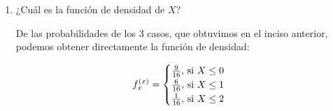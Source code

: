 \documentclass[12pt,a4paper]{report}
\begin{document}
\begin{enumerate}
{\begin{enumerate}
{					Tenemos que X toma los valores $X = \{0,1,2\}$\\
					
					En cada caso hay una posibilidad de $\frac{1}{4}$ de que la bola entre en la primera caja, sea "b" el símbolo que represente una bola en la primera caja y "0" cuando no está en la caja, tendríamos cuatro resultados:\\
					
					$P(00) = (\frac{3}{4})\cdot(\frac{3}{4})$\\
					$P(0b) = (\frac{3}{4})\cdot(\frac{1}{4})$\\
					$P(b0) = (\frac{1}{4})\cdot(\frac{3}{4})$\\
					$P(bb) = (\frac{1}{4})\cdot(\frac{1}{4})$\\
					
					De ahí, obtenemos las probabilidades de los 3 casos:\\
					
					$P(X=0) = P(00) = \frac{9}{16}$\\
					$P(X=1) = P(b0) + P(0b) = \frac{3}{16} + \frac{3}{16} = \frac{6}{16}$\\
					$P(X=2) = P(bb) = \frac{1}{16}$\\
					
					Entonces, encontramos la función de distribución sumando las probabilidades de los casos cuando se vayan acumulando:
					
					\[
				F_{x}^{(x)} = \begin{cases}
								\frac{9}{16}, $ si $ X \leq 0\\
								\frac{15}{16}, $ si $ X \leq 1\\
								1, $ si $ X \leq 2\\
						 	 \end{cases}
			\]
										
					
				}

				\item {
					¿Cuál es la función de densidad de $X$?
					
					De las probabilidades de los 3 casos, que obtuvimos en el inciso anterior, podemos obtener directamente la función de densidad:
					
					\[
				f_{x}^{(x)} = \begin{cases}
								\frac{9}{16}, $ si $ X \leq 0\\
								\frac{6}{16}, $ si $ X \leq 1\\
								\frac{1}{16}, $ si $ X \leq 2\\
						 	 \end{cases}
			\]
			
}
\end{enumerate}}
\end{enumerate}
\end{document}
